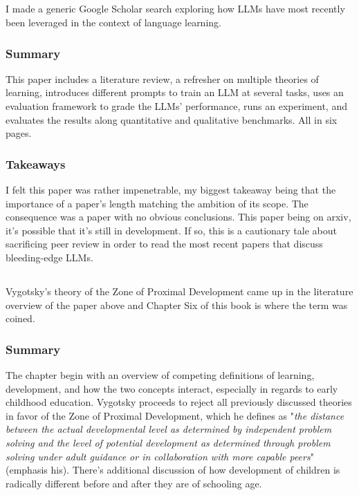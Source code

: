 \documentclass[
	letterpaper, %
]{jdf}
\begin{document}
\subsection{}
I made a generic Google Scholar search exploring how LLMs have most recently been leveraged in the context of language learning.

\subsubsection{Summary}
This paper includes a literature review, a refresher on multiple theories of learning, introduces different prompts to train an LLM at several tasks, uses an evaluation framework to grade the LLMs' performance, runs an experiment, and evaluates the results along quantitative and qualitative benchmarks. All in six pages. 

\subsubsection{Takeaways}
I felt this paper was rather impenetrable, my biggest takeaway being that the importance of a paper's length matching the ambition of its scope. The consequence was a paper with no obvious conclusions. This paper being on arxiv, it's possible that it's still in development. If so, this is a cautionary tale about sacrificing peer review in order to read the most recent papers that discuss bleeding-edge LLMs.

\subsection{}
Vygotsky's theory of the Zone of Proximal Development came up in the literature overview of the paper above and Chapter Six of this book is where the term was coined.

\subsubsection{Summary}
The chapter begin with an overview of competing definitions of learning, development, and how the two concepts interact, especially in regards to early childhood education. Vygotsky proceeds to reject all previously discussed theories in favor of the Zone of Proximal Development, which he defines as "\textit{the distance between the actual developmental level as determined by independent problem solving and the level of potential development as determined through problem solving under adult guidance or in collaboration with more capable peers}" (emphasis his). There's additional discussion of how development of children is radically different before and after they are of schooling age.
\end{document}
